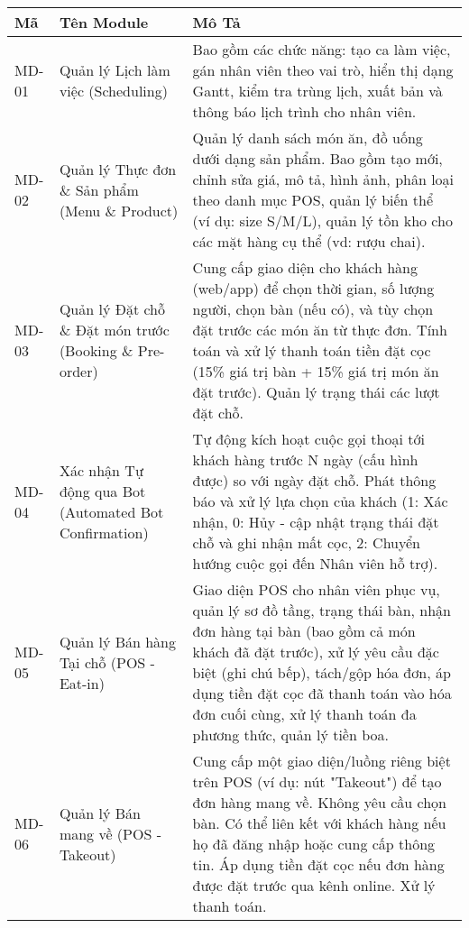 \newpage



\begin{longtable}{|m{1.5cm}|m{4.5cm}|m{9cm}|}
\hline
\textbf{Mã} & \textbf{Tên Module} & \textbf{Mô Tả} \\
\hline
\endhead %

\hline
\endfoot %

\hline
\endlastfoot %

MD-01 & Quản lý Lịch làm việc (Scheduling) & Bao gồm các chức năng: tạo ca làm việc, gán nhân viên theo vai trò, hiển thị dạng Gantt, kiểm tra trùng lịch, xuất bản và thông báo lịch trình cho nhân viên. \\
\hline
MD-02 & Quản lý Thực đơn \& Sản phẩm (Menu \& Product) & Quản lý danh sách món ăn, đồ uống dưới dạng sản phẩm. Bao gồm tạo mới, chỉnh sửa giá, mô tả, hình ảnh, phân loại theo danh mục POS, quản lý biến thể (ví dụ: size S/M/L), quản lý tồn kho cho các mặt hàng cụ thể (vd: rượu chai). \\
\hline
MD-03 & Quản lý Đặt chỗ \& Đặt món trước (Booking \& Pre-order) & Cung cấp giao diện cho khách hàng (web/app) để chọn thời gian, số lượng người, chọn bàn (nếu có), và tùy chọn đặt trước các món ăn từ thực đơn. Tính toán và xử lý thanh toán tiền đặt cọc (15\% giá trị bàn + 15\% giá trị món ăn đặt trước). Quản lý trạng thái các lượt đặt chỗ. \\
\hline
MD-04 & Xác nhận Tự động qua Bot (Automated Bot Confirmation) & Tự động kích hoạt cuộc gọi thoại tới khách hàng trước N ngày (cấu hình được) so với ngày đặt chỗ. Phát thông báo và xử lý lựa chọn của khách (1: Xác nhận, 0: Hủy - cập nhật trạng thái đặt chỗ và ghi nhận mất cọc, 2: Chuyển hướng cuộc gọi đến Nhân viên hỗ trợ). \\
\hline
MD-05 & Quản lý Bán hàng Tại chỗ (POS - Eat-in) & Giao diện POS cho nhân viên phục vụ, quản lý sơ đồ tầng, trạng thái bàn, nhận đơn hàng tại bàn (bao gồm cả món khách đã đặt trước), xử lý yêu cầu đặc biệt (ghi chú bếp), tách/gộp hóa đơn, áp dụng tiền đặt cọc đã thanh toán vào hóa đơn cuối cùng, xử lý thanh toán đa phương thức, quản lý tiền boa. \\
\hline
MD-06 & Quản lý Bán mang về (POS - Takeout) & Cung cấp một giao diện/luồng riêng biệt trên POS (ví dụ: nút "Takeout") để tạo đơn hàng mang về. Không yêu cầu chọn bàn. Có thể liên kết với khách hàng nếu họ đã đăng nhập hoặc cung cấp thông tin. Áp dụng tiền đặt cọc nếu đơn hàng được đặt trước qua kênh online. Xử lý thanh toán. \\

\end{longtable}
